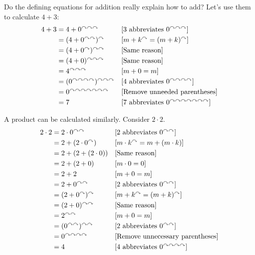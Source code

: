 \begin{example}
Do the defining equations for addition really explain how to add? Let's use them to calculate
$4+3$:
\begin{align*}
  4 + 3 &= 4 + 0^{\nxt\nxt\nxt}&&\text{[$3$ abbreviates $0^{\nxt\nxt\nxt}$]}\\
  &= (4 + 0^{\nxt\nxt})^\nxt &&\text{[$m+k^\nxt = (m+k)^\nxt$]}\\
  &= (4 + 0^\nxt)^{\nxt\nxt} &&\text{[Same reason]}\\
  &= (4 + 0)^{\nxt\nxt\nxt} &&\text{[Same reason]}\\
  &= 4^{\nxt\nxt\nxt} &&\text{[$m+0 = m$]}\\
  &= (0^{\nxt\nxt\nxt\nxt})^{\nxt\nxt\nxt} && \text{[$4$ abbreviates $0^{\nxt\nxt\nxt\nxt}$]}\\
  &= 0^{\nxt\nxt\nxt\nxt\nxt\nxt\nxt} && \text{[Remove unneeded parentheses]}\\
  &= 7 &&\text{[$7$ abbreviates $0^{\nxt\nxt\nxt\nxt\nxt\nxt\nxt}$]}
\end{align*}
\end{example}
\ipadbreak

\begin{example}
A product can be calculated similarly. Consider $2\cdot 2$.
\begin{align*}
  2\cdot 2 &= 2\cdot 0^{\nxt\nxt} &&\text{[$2$ abbreviates $0^{\nxt\nxt}$]}\\
           &= 2 + (2\cdot 0^\nxt) &&\text{[$m\cdot k^\nxt = m + (m\cdot k)$]}\\
           &= 2 + (2 + (2\cdot 0))&&\text{[Same reason]}\\
           &= 2 + (2 + 0) &&\text{[$m\cdot 0=0$]}\\
           &= 2 + 2&&\text{[$m+0 = m$]}\\
           &= 2 + 0^{\nxt\nxt}&&\text{[$2$ abbreviates $0^{\nxt\nxt}$]}\\
           &= (2 + 0^\nxt)^\nxt &&\text{[$m+k^\nxt = (m+k)^\nxt$]}\\
           &= (2 + 0)^{\nxt\nxt}&&\text{[Same reason]}\\
           &= 2^{\nxt\nxt} &&\text{[$m+0 = m$]}\\
           &= (0^{\nxt\nxt})^{\nxt\nxt} &&\text{[$2$ abbreviates $0^{\nxt\nxt}$]}\\
           &= 0^{\nxt\nxt\nxt\nxt}&&\text{[Remove unnecessary parentheses]}\\
           &= 4 &&\text{[$4$ abbreviates $0^{\nxt\nxt\nxt\nxt}$]}
\end{align*}
\end{example}


